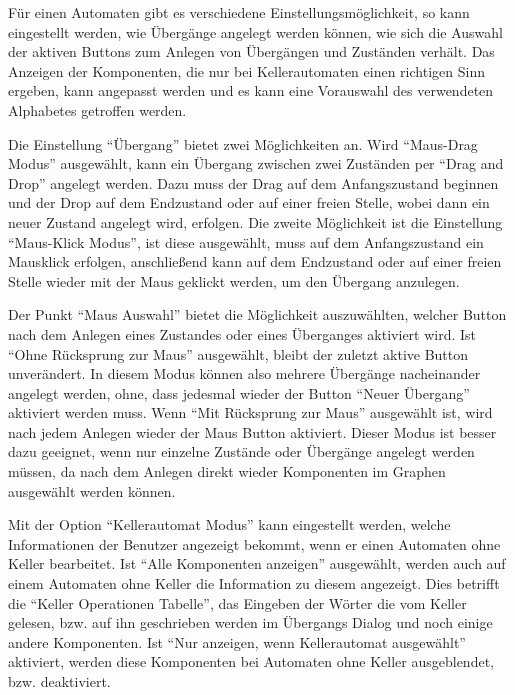Für einen Automaten gibt es verschiedene Einstellungsmöglichkeit, so kann
eingestellt werden, wie Übergänge angelegt werden können, wie sich die
Auswahl der aktiven Buttons zum Anlegen von Übergängen und Zuständen verhält.
Das Anzeigen der Komponenten, die nur bei Kellerautomaten einen richtigen Sinn
ergeben, kann angepasst werden und es kann eine Vorauswahl des verwendeten
Alphabetes getroffen werden.\vspace{10pt}

Die Einstellung "`Übergang"' bietet zwei Möglichkeiten an. Wird "`Maus-Drag Modus"'
ausgewählt, kann ein Übergang zwischen zwei Zuständen per "`Drag and Drop"' angelegt
werden. Dazu muss der Drag auf dem Anfangszustand beginnen und der Drop auf dem
Endzustand oder auf einer freien Stelle, wobei dann ein neuer Zustand angelegt wird,
erfolgen. Die zweite Möglichkeit ist die Einstellung "`Maus-Klick Modus"', ist diese
ausgewählt, muss auf dem Anfangszustand ein Mausklick erfolgen, anschließend kann auf
dem Endzustand oder auf einer freien Stelle wieder mit der Maus geklickt werden,
um den Übergang anzulegen.\vspace{10pt}

Der Punkt "`Maus Auswahl"' bietet die Möglichkeit auszuwählten, welcher Button nach
dem Anlegen eines Zustandes oder eines Überganges aktiviert wird. Ist "`Ohne
Rücksprung zur Maus"' ausgewählt, bleibt der zuletzt aktive Button unverändert.
In diesem Modus können also mehrere Übergänge nacheinander angelegt werden, ohne,
dass jedesmal wieder der Button "`Neuer Übergang"' aktiviert werden muss. Wenn
"`Mit Rücksprung zur Maus"' ausgewählt ist, wird nach jedem Anlegen wieder der
Maus Button aktiviert. Dieser Modus ist besser dazu geeignet, wenn nur einzelne
Zustände oder Übergänge angelegt werden müssen, da nach dem Anlegen direkt wieder
Komponenten im Graphen ausgewählt werden können.\vspace{10pt}

Mit der Option "`Kellerautomat Modus"' kann eingestellt werden, welche Informationen
der Benutzer angezeigt bekommt, wenn er einen Automaten ohne Keller bearbeitet. Ist
"`Alle Komponenten anzeigen"' ausgewählt, werden auch auf einem Automaten ohne Keller
die Information zu diesem angezeigt. Dies betrifft die "`Keller Operationen Tabelle"',
das Eingeben der Wörter die vom Keller gelesen, bzw. auf ihn geschrieben werden im
Übergangs Dialog und noch einige andere Komponenten. Ist "`Nur anzeigen, wenn
Kellerautomat ausgewählt"' aktiviert, werden diese Komponenten bei Automaten ohne
Keller ausgeblendet, bzw. deaktiviert.\vspace{10pt}

